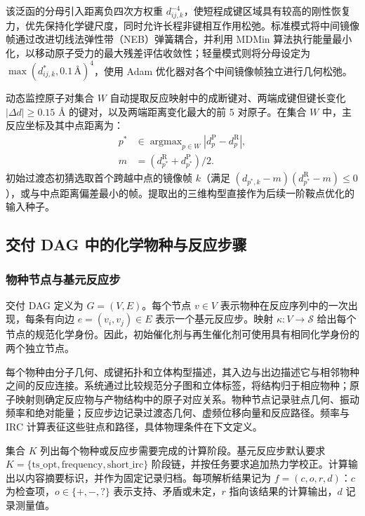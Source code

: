 该泛函的分母引入距离负四次方权重 $d_{ij,k}^{-4}$，使短程成键区域具有较高的刚性恢复力，优先保持化学键尺度，同时允许长程非键相互作用松弛。标准模式将中间镜像帧通过改进切线法弹性带（NEB）弹簧耦合，并利用 MDMin 算法执行能量最小化，以移动原子受力的最大残差评估收敛性\citep{neb2000,ase2017}；轻量模式则将分母设定为 $\max(d_{ij,k}^*,0.1\,\text{Å})^4$，使用 Adam 优化器对各个中间镜像帧独立进行几何松弛。\citep{adam2015}

动态监控原子对集合 $W$ 自动提取反应映射中的成断键对、两端成键但键长变化 $|\Delta d|\ge 0.15$ Å 的键对，以及两端距离变化最大的前 5 对原子。在集合 $W$ 中，主反应坐标及其中点距离为：
\[
\begin{aligned}
p^*&\in\operatorname{argmax}_{p\in W}|d_p^{\mathrm{P}}-d_p^{\mathrm{R}}|,\\
m&=(d_{p^*}^{\mathrm{R}}+d_{p^*}^{\mathrm{P}})/2.
\end{aligned}
\]
初始过渡态初猜选取首个跨越中点的镜像帧 $k$（满足 $(d_{p^*,k}-m)(d_{p^*}^{\mathrm{R}}-m)\le 0$），或与中点距离偏差最小的帧。提取出的三维构型直接作为后续一阶鞍点优化的输入种子。

\subsection{交付 DAG 中的化学物种与反应步骤}

\subsubsection{物种节点与基元反应步}
交付 DAG 定义为 $G=(V,E)$。每个节点 $v\in V$ 表示物种在反应序列中的一次出现，每条有向边 $e=(v_i,v_j)\in E$ 表示一个基元反应步。映射 $\kappa:V\to\mathcal{S}$ 给出每个节点的规范化学身份。因此，初始催化剂与再生催化剂可使用具有相同化学身份的两个独立节点。

每个物种由分子几何、成键拓扑和立体构型描述，其入边与出边描述它与相邻物种之间的反应连接。系统通过比较规范分子图和立体标签，将结构归于相应物种；原子映射则确定反应物与产物结构中的原子对应关系。物种节点记录驻点几何、振动频率和绝对能量；反应步边记录过渡态几何、虚频位移向量和反应路径。频率与 IRC 计算表征这些驻点和路径，具体物理条件在下文定义。

集合 $K$ 列出每个物种或反应步需要完成的计算阶段。基元反应步默认要求 $K=\{\text{ts\_opt}, \text{frequency}, \text{short\_irc}\}$ 阶段链，并按任务要求追加热力学校正。计算输出以内容摘要标识，并作为固定记录归档。每项解析结果记为 $f=(c,o,r,d)$：$c$ 为检查项，$o\in\{+,-,?\}$ 表示支持、矛盾或未定，$r$ 指向该结果的计算输出，$d$ 记录测量值。

